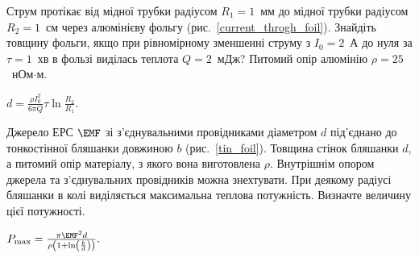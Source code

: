 \begin{problem}\label{prb:current_throgh_foil}
    Струм протікає від мідної трубки радіусом $R_1 = 1$~мм до мідної трубки радіусом $R_2 = 1$~см через алюмінієву фольгу (рис.~\ref{current_throgh_foil}). Знайдіть товщину фольги, якщо при рівномірному зменшенні струму з $I_0 = 2$~А до нуля за $\tau = 1$~хв в фользі виділась теплота $Q=2$~мДж? Питомий опір алюмінію $\rho = 25$~нОм$\cdot$м.
\begin{solution}
	$d = \frac{\rho I_0^2}{6\pi Q} \tau \ln\frac{R_2}{R_1}$.
\end{solution}
\end{problem}

\begin{problem}\label{prb:tin_foil}
    Джерело ЕРС $\EMF$ зі з'єднувальними провідниками діаметром $d$ під'єднано до тонкостінної бляшанки довжиною $b$ (рис.~\ref{tin_foil}). Товщина стінок бляшанки $d$, а питомий опір матеріалу, з якого вона виготовлена $\rho$.  Внутрішнім опором джерела та з'єднувальних провідників можна знехтувати. При деякому  радіусі  бляшанки в колі виділяється максимальна теплова потужність. Визначте величину цієї потужності.
\begin{solution}
	$P_{\max} = \frac{\pi\EMF^2 d}{\rho \left( 1 + \ln\left( \frac{b}{d}\right)  \right) }.$
\end{solution}
\end{problem}

